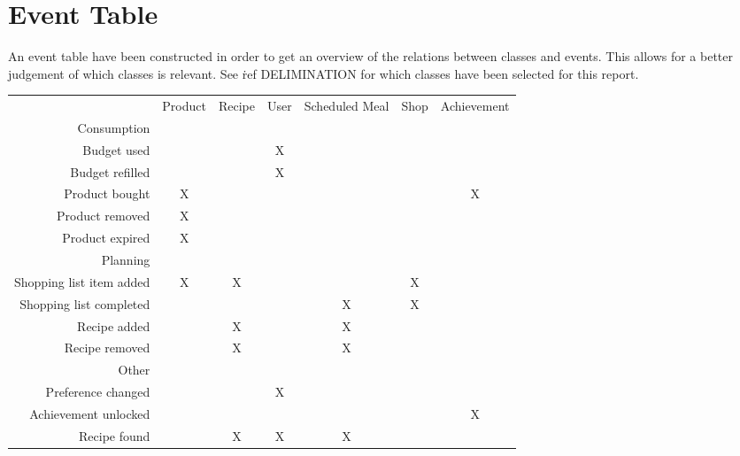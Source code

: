 \section{Event Table}
An event table have been constructed in order to get an overview of the relations between classes and events. This allows for a better judgement of which classes is relevant. See \.ref DELIMINATION for which classes have been selected for this report.
\begin{table}[h]
\begin{tabular}{r c c c c c c}
                          \vline           & Product& Recipe & User & Scheduled Meal & Shop & Achievement\\
 Consumption              \vline           &        &        &      &                &      &            \\   
 \hline    
 Budget used    		  \vline           &        &        &   X  &                &      &            \\
 Budget refilled		  \vline	       &        &        &   X  &                &      &            \\
 Product bought 		  \vline    	   &     X  &        &      &                &      &          X \\
 Product removed		  \vline    	   &     X  &        &      &                &      &            \\
 Product expired		  \vline	       &     X  &        &      &                &      &            \\
 \hline				
 Planning   	          \vline           &        &        &      &                &      &            \\
 \hline 
 Shopping list item added \vline    	   &     X  &      X &      &                &    X &            \\
 Shopping list completed  \vline	       &        &        &      &              X &    X &            \\
 Recipe added			  \vline	       &        &      X &      &              X &      &            \\
 Recipe removed           \vline	       &        &      X &      &              X &      &            \\
 \hline           
 Other                    \vline           &        &        &      &                &      &            \\ 
 \hline        
 Preference changed       \vline	       &        &        &   X  &                &      &            \\
 Achievement unlocked     \vline	       &        &        &      &                &      &          X \\
 Recipe found              \vline          &        &      X &    X &              X &      &            
\end{tabular}
\end{table}